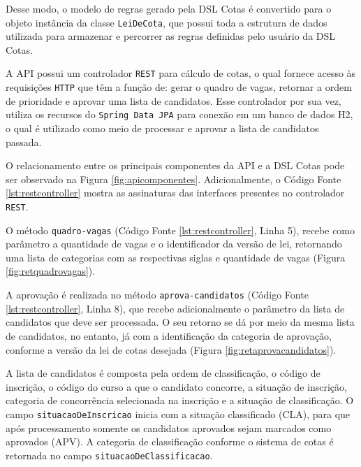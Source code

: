 

Desse modo, o modelo de regras gerado pela DSL Cotas é convertido para o objeto instância da classe \texttt{LeiDeCota}, que possui toda a estrutura de dados utilizada para armazenar e percorrer as regras definidas pelo usuário da DSL Cotas. 

A API possui um controlador \texttt{REST} para cálculo de cotas, o qual fornece acesso às requisições \texttt{HTTP} que têm a função de: gerar o quadro de vagas, retornar a ordem de prioridade e aprovar uma lista de candidatos. Esse controlador por sua vez, utiliza os recursos do \texttt{Spring Data JPA} para conexão em um banco de dados H2, o qual é utilizado como meio de processar e aprovar a lista de candidatos passada.


O relacionamento entre os principais componentes da \gls{API} e a DSL Cotas pode ser observado na Figura \ref{fig:apicomponentes}. Adicionalmente, o Código Fonte \ref{lst:restcontroller} mostra as assinaturas das interfaces presentes no controlador \texttt{REST}.





\newpage
O método \texttt{quadro-vagas} (Código Fonte \ref{lst:restcontroller}, Linha 5), recebe como parâmetro a quantidade de vagas e o identificador da versão de lei, retornando uma lista de categorias com as respectivas siglas e quantidade de vagas (Figura \ref{fig:retquadrovagas}).



A aprovação é realizada no método \texttt{aprova-candidatos} (Código Fonte \ref{lst:restcontroller}, Linha 8), que recebe adicionalmente o parâmetro da lista de candidatos que deve ser processada. O seu retorno se dá por meio da mesma lista de candidatos, no entanto, já com a identificação da categoria de aprovação, conforme a versão da lei de cotas desejada (Figura \ref{fig:retaprovacandidatos}).


A lista de candidatos é composta pela ordem de classificação, o código de inscrição, o código do curso a que o candidato concorre, a situação de inscrição, categoria de concorrência selecionada na inscrição e a situação de classificação. O campo \texttt{situacaoDeInscricao} inicia com a situação classificado (CLA), para que após processamento somente os candidatos aprovados sejam marcados como aprovados (APV). A categoria de classificação conforme o sistema de cotas é retornada no campo \texttt{situacaoDeClassificacao}.

